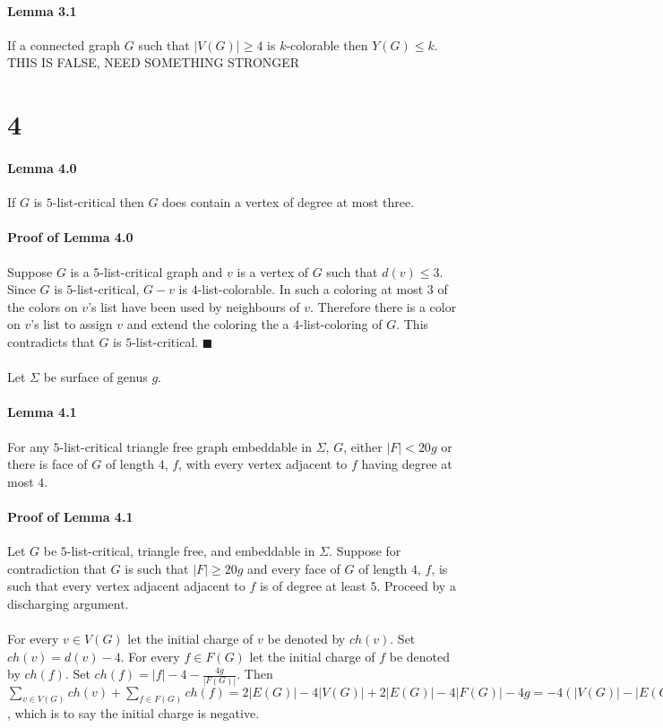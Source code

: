\documentclass[letterpaper,12pt,oneside,onecolumn]{report}
\begin{document}
\paragraph{Lemma 3.1}
If a connected graph $G$ such that $|V(G)| \geq 4$ is $k$-colorable then $Y(G) \leq k$. THIS IS FALSE, NEED SOMETHING STRONGER
\section*{4}
\paragraph{Lemma 4.0}
If $G$ is $5$-list-critical then $G$ does contain a vertex of degree at most three.
\paragraph{Proof of Lemma 4.0}
Suppose $G$ is a $5$-list-critical graph and $v$ is a vertex of $G$ such that $d(v) \leq 3$. Since $G$ is $5$-list-critical, $G-v$ is $4$-list-colorable. In such a coloring at most $3$ of the colors on $v$'s list have been used by neighbours of $v$. Therefore there is a color on $v$'s list to assign $v$ and extend the coloring the a $4$-list-coloring of $G$. This contradicts that $G$ is $5$-list-critical. $\blacksquare$
\paragraph{}
Let $\Sigma$ be surface of genus $g$.
\paragraph{Lemma 4.1}
For any $5$-list-critical triangle free graph embeddable in $\Sigma$, $G$, either $|F| < 20g$ or there is face of $G$ of length $4$, $f$, with every vertex adjacent to $f$ having degree at most $4$. 
\paragraph{Proof of Lemma 4.1}
Let $G$ be $5$-list-critical, triangle free, and embeddable in $\Sigma$. Suppose for contradiction that $G$ is such that $|F| \geq 20g$ and every face of $G$ of length $4$, $f$, is such that every vertex adjacent adjacent to $f$ is of degree at least $5$. Proceed by a discharging argument.
\paragraph{}
For every $v \in V(G)$ let the initial charge of $v$ be denoted by $ch(v)$. Set $ch(v) = d(v) - 4$. For every $f \in F(G)$ let the initial charge of $f$ be denoted by $ch(f)$. Set $ch(f) = |f| - 4 -\frac{4g}{|F(G)|}$. Then $\sum_{v \in V(G)} ch(v) + \sum_{f \in F(G)} ch(f) = 2|E(G)| - 4|V(G)| + 2|E(G)| - 4|F(G)| -4g = -4(|V(G)| - |E(G)| - |F(G)| + g) = -4(2-g + g) = -8$, which is to say the initial charge is negative.
\end{document}
